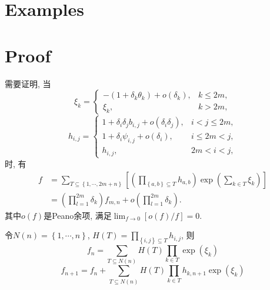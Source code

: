 \documentclass{article}
\newcommand{\sbrace}[1]{\left(#1\right)}
\newcommand{\mbrace}[1]{\left[#1\right]}
\newcommand{\bbrace}[1]{\left\{#1\right\}}
\begin{document}
\section{Examples}

\section{Proof}
需要证明, 当
\begin{equation}
\xi_k=\left\{\begin{array}{ll}
-\sbrace{1+\delta_k \theta_k}+o\sbrace{\delta_k}, & k\le 2m, \\ 
\xi_k, & k>2m,   
\end{array}\right.
\end{equation}
\begin{equation}
h_{i,j}=\left\{\begin{array}{ll}
1+\delta_i \delta_j b_{i,j}+o\sbrace{\delta_i \delta_j}, & i<j\le 2m, \\
1+\delta_i \psi_{i,j}+o\sbrace{\delta_i}, & i\le 2m < j , \\
h_{i,j}, & 2m<i<j,
\end{array}\right.
\end{equation}
时, 有
\begin{equation}
\begin{aligned}
f&=\sum_{T\subseteq \bbrace{1,\cdots,2m+n}}{\mbrace{
  \sbrace{\prod_{\bbrace{a,b}\subseteq T}{h_{a,b}}}
  \exp\sbrace{\sum_{k\in T}{\xi_k}} 
}} \\ 
&=\sbrace{\prod_{l=1}^{2m}{\delta_k}}f_{m,n}+o\sbrace{\prod_{l=1}^{2m}{\delta_k}}.
\end{aligned}
\end{equation}
其中$o(f)$是Peano余项, 满足$\lim_{f\rightarrow 0}[o(f)/f]=0$.

令$N(n)=\bbrace{1,\cdots,n}$, $H(T)=\prod_{\bbrace{i,j}\subseteq T}{h_{i,j}}$, 则
\begin{equation}
  f_n=\sum_{T \subseteq N(n)}{H(T)\prod_{k \in T}{\exp\sbrace{\xi_k}}}
\end{equation}
\begin{equation}
  f_{n+1}=f_n+\sum_{T\subseteq N(n)}{H(T)\prod_{k\in T}{h_{k,n+1}\exp(\xi_k)}}
\end{equation}
\end{document}
